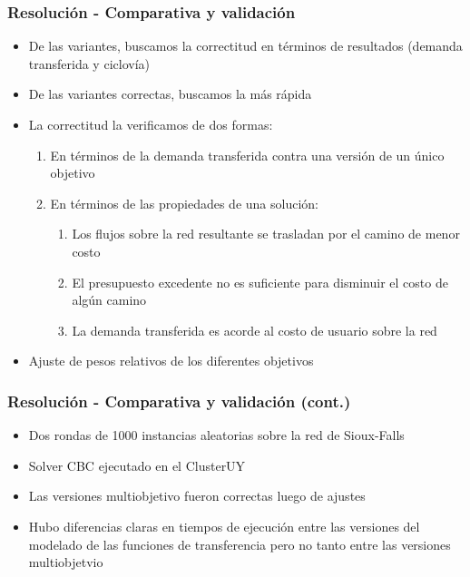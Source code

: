 \documentclass[aspectratio=43, 10pt]{beamer}
\begin{document}
\begin{frame}
    \frametitle{Resolución - Comparativa y validación}

    \begin{itemize}
        \item{De las variantes, buscamos la correctitud en términos de resultados (demanda transferida y ciclovía)}
        \item{De las variantes correctas, buscamos la más rápida}
        \item{La correctitud la verificamos de dos formas:
             \begin{enumerate}
                \item{En términos de la demanda transferida contra una versión de un único objetivo}
                \item{En términos de las propiedades de una solución:
                    \begin{enumerate}
                        \item{Los flujos sobre la red resultante se trasladan por el camino de menor costo}
                        \item{El presupuesto excedente no es suficiente para disminuir el costo de algún camino}
                        \item{La demanda transferida es acorde al costo de usuario sobre la red}
                    \end{enumerate}
                }
            \end{enumerate}
        }
    \item{Ajuste de pesos relativos de los diferentes objetivos}
    \end{itemize}
\end{frame}

\begin{frame}
    \frametitle{Resolución - Comparativa y validación (cont.)}

    \begin{itemize}
        \item{Dos rondas de 1000 instancias aleatorias sobre la red de Sioux-Falls}
        \item{Solver CBC ejecutado en el ClusterUY}
        \item{Las versiones multiobjetivo fueron correctas luego de ajustes}
        \item{Hubo diferencias claras en tiempos de ejecución entre las versiones
            del modelado de las funciones de transferencia pero no tanto entre las
            versiones multiobjetvio}
    \end{itemize}
\end{frame}
\end{document}
